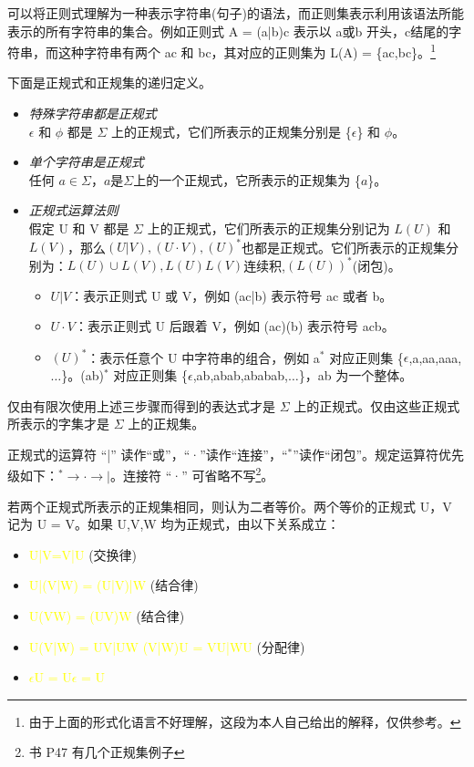 可以将正则式理解为一种表示字符串(句子)的语法，而正则集表示利用该语法所能表示的所有字符串的集合。例如正则式 A = (a|b)c 表示以 a或b 开头，c结尾的字符串，而这种字符串有两个 ac 和 bc，其对应的正则集为  L(A) = \{ac,bc\}。\footnote{由于上面的形式化语言不好理解，这段为本人自己给出的解释，仅供参考。}

下面是正规式和正规集的递归定义。

\begin{itemize}
    \item \textit{特殊字符串都是正规式} \\
          $\epsilon$ 和 $\phi$ 都是 $\Sigma$ 上的正规式，它们所表示的正规集分别是 \{$\epsilon$\} 和 $\phi$。
    \item \textit{单个字符串是正规式 }\\
          任何 $a\in\Sigma$，$a$是$\Sigma$上的一个正规式，它所表示的正规集为 \{$a$\}。
    \item \textit{正规式运算法则}\\
          假定 U 和 V 都是 $\Sigma$ 上的正规式，它们所表示的正规集分别记为 $L(U)$ 和 $L(V)$，那么$(U|V),(U \cdot V),(U)^{*}$也都是正规式。它们所表示的正规集分别为：$L(U)\cup L(V),L(U) L(V)$连续积,$(L(U))^{*}$(闭包)。
          \begin{itemize}
              \item $U|V$：表示正则式 U 或 V，例如 (ac|b) 表示符号 ac 或者 b。
              \item $U \cdot V$：表示正则式 U 后跟着 V，例如 (ac)(b) 表示符号 acb。
              \item $(U)^{*}$：表示任意个 U 中字符串的组合，例如 a$^{*}$ 对应正则集 \{$\epsilon$,a,aa,aaa,$\dots$\}。(ab)$^{*}$ 对应正则集 \{$\epsilon$,ab,abab,ababab,$\dots$\}，ab 为一个整体。
          \end{itemize}
\end{itemize}

仅由有限次使用上述三步骤而得到的表达式才是 $\Sigma$ 上的正规式。仅由这些正规式所表示的字集才是 $\Sigma$ 上的正规集。

正规式的运算符 ``|'' 读作``或''，``·''读作``连接''，``$^{*}$''读作``闭包''。规定运算符优先级如下：\textcolor{imp}{$^{*} \rightarrow \text{·} \rightarrow |$}。连接符 ``·'' 可省略不写\footnote{书 P47 有几个正规集例子}。

若两个正规式所表示的正规集相同，则认为二者等价。两个等价的正规式 U，V 记为 U = V。如果 U,V,W 均为正规式，由以下关系成立：

\begin{itemize}
    \item \textcolor{mark}{U|V=V|U} \hfill (交换律)
    \item \textcolor{mark}{U|(V|W) = (U|V)|W} \hfill (结合律)
    \item \textcolor{mark}{U(VW) = (UV)W} \hfill (结合律)
    \item \textcolor{mark}{U(V|W) = UV|UW \quad (V|W)U = VU|WU}  \hfill (分配律)
    \item \textcolor{mark}{$\epsilon$U = U$\epsilon$ = U}
\end{itemize}

